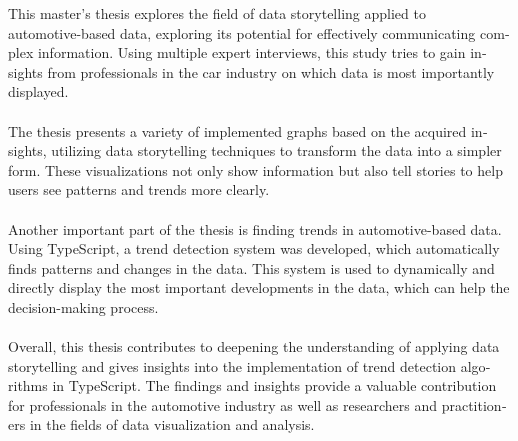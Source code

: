 \begin{otherlanguage}{american}
This master’s thesis explores the field of data storytelling applied to \\automotive-based data, exploring its potential for effectively communicating complex information. Using multiple expert interviews, this study tries to gain insights from professionals in the car industry on which data is most importantly displayed.\\\\
The thesis presents a variety of implemented graphs based on the acquired insights, utilizing data storytelling techniques to transform the data into a simpler form. These visualizations not only show information but also tell stories to help users see patterns and trends more clearly.\\\\
Another important part of the thesis is finding trends in automotive-based data. Using TypeScript, a trend detection system was developed, which automatically finds patterns and changes in the data. This system is used to dynamically and directly display the most important developments in the data, which can help the decision-making process.\\\\
Overall, this thesis contributes to deepening the understanding of applying data storytelling and gives insights into the implementation of trend detection algorithms in TypeScript. The findings and insights provide a valuable contribution for professionals in the automotive industry as well as researchers and practitioners in the fields of data visualization and analysis.
\end{otherlanguage} %
